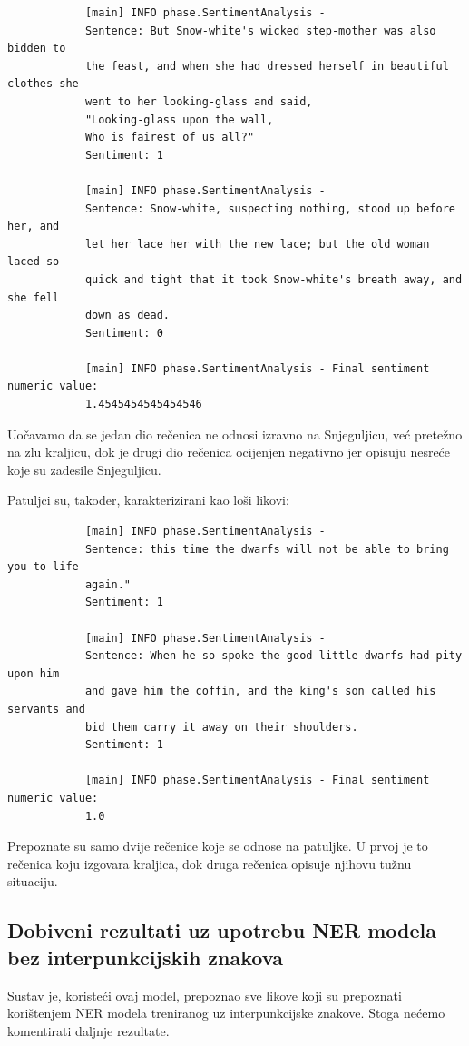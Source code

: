 \documentclass[a4paper,twoside,12pt]{memoir} %
\begin{document}
\begin{verbatim}
			[main] INFO phase.SentimentAnalysis -
			Sentence: But Snow-white's wicked step-mother was also bidden to
			the feast, and when she had dressed herself in beautiful clothes she
			went to her looking-glass and said,
			"Looking-glass upon the wall,
			Who is fairest of us all?"
			Sentiment: 1

			[main] INFO phase.SentimentAnalysis -
			Sentence: Snow-white, suspecting nothing, stood up before her, and
			let her lace her with the new lace; but the old woman laced so
			quick and tight that it took Snow-white's breath away, and she fell
			down as dead.
			Sentiment: 0

			[main] INFO phase.SentimentAnalysis - Final sentiment numeric value:
			1.4545454545454546
		\end{verbatim}

		Uočavamo da se jedan dio rečenica ne odnosi izravno na Snjeguljicu, već pre\-tež\-no na zlu kraljicu, dok je drugi dio rečenica ocijenjen negativno jer opisuju nesreće koje su zadesile Snjeguljicu.

		Patuljci su, također, karakterizirani kao loši likovi:

		\begin{verbatim}
			[main] INFO phase.SentimentAnalysis -
			Sentence: this time the dwarfs will not be able to bring you to life
			again."
			Sentiment: 1

			[main] INFO phase.SentimentAnalysis -
			Sentence: When he so spoke the good little dwarfs had pity upon him
			and gave him the coffin, and the king's son called his servants and
			bid them carry it away on their shoulders.
			Sentiment: 1

			[main] INFO phase.SentimentAnalysis - Final sentiment numeric value:
			1.0
		\end{verbatim}

		Prepoznate su samo dvije rečenice koje se odnose na patuljke. U prvoj je to rečenica koju izgovara kraljica, dok druga rečenica opisuje njihovu tužnu situaciju.

		\subsection{Dobiveni rezultati uz upotrebu NER modela bez interpunkcijskih znakova}

		Sustav je, koristeći ovaj model, prepoznao sve likove koji su prepoznati korištenjem NER modela treniranog uz interpunkcijske znakove. Stoga nećemo komentirati daljnje rezultate.
		\newpage
\end{document}
